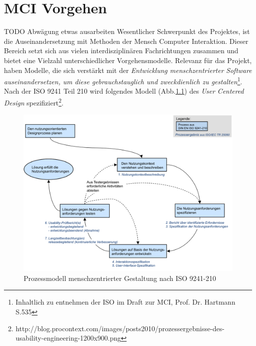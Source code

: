 
\chapter{MCI Vorgehen}

TODO Abwägung etwas ausarbeiten
Wesentlicher Schwerpunkt des Projektes, ist die Auseinandersetzung mit Methoden der Mensch Computer Interaktion. Dieser Bereich  setzt sich aus vielen interdisziplinären Fachrichtungen zusammen und bietet eine Vielzahl unterschiedlicher Vorgehensmodelle. 
Relevanz für das Projekt, haben Modelle, die sich verstärkt mit der \textit{Entwicklung menschzentrierter Software auseinandersetzen, um diese gebrauchstauglich und zweckdienlich zu gestalten}\footnote{Inhaltlich zu entnehmen der ISO im Draft zur MCI, Prof. Dr. Hartmann S.535}.
Nach der ISO 9241 Teil 210 wird folgendes Modell (Abb.\ref{prozessmodell}) des \textit{User Centered Design} spezifiziert\footnote{http://blog.procontext.com/images/posts2010/prozessergebnisse-des-usability-engineering-1200x900.png}. 

\begin{figure}[H]
\includegraphics[width=.9\textwidth]{./images/prozessergebnisse.png}
\caption{Prozessmodell menschzentrierter Gestaltung nach ISO 9241-210 }
\label{prozessmodell}
\end{figure}

